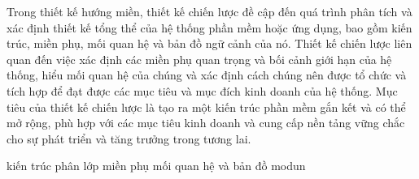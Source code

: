 
Trong thiết kế hướng miền, thiết kế chiến lược đề cập đến quá trình phân tích và xác định thiết kế tổng thể của hệ thống phần mềm hoặc ứng dụng, bao gồm kiến trúc, miền phụ, mối quan hệ và bản đồ ngữ cảnh của nó. Thiết kế chiến lược liên quan đến việc xác định các miền phụ quan trọng và bối cảnh giới hạn của hệ thống, hiểu mối quan hệ của chúng và xác định cách chúng nên được tổ chức và tích hợp để đạt được các mục tiêu và mục đích kinh doanh của hệ thống. Mục tiêu của thiết kế chiến lược là tạo ra một kiến trúc phần mềm gắn kết và có thể mở rộng, phù hợp với các mục tiêu kinh doanh và cung cấp nền tảng vững chắc cho sự phát triển và tăng trưởng trong tương lai.

%
kiến trúc phân lớp
miền phụ
mối quan hệ và bản đồ
modun